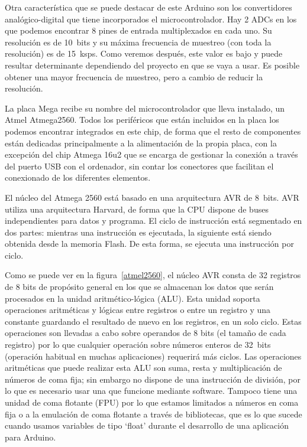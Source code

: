 Otra característica que se puede destacar de este Arduino son los convertidores analógico-digital que tiene incorporados el microcontrolador. Hay 2 ADCs en los que podemos encontrar 8 pines de entrada multiplexados en cada uno. Su resolución es de 10~bits y su máxima frecuencia de muestreo (con toda la resolución) es de 15~ksps. Como veremos después, este valor es bajo y puede resultar determinante dependiendo del proyecto en que se vaya a usar. Es posible obtener una mayor frecuencia de muestreo, pero a cambio de reducir la resolución.

La placa Mega recibe su nombre del microcontrolador que lleva instalado, un Atmel Atmega2560. Todos los periféricos que están incluidos en la placa los podemos encontrar integrados en este chip, de forma que el resto de componentes están dedicadas principalmente a la alimentación de la propia placa, con la excepción del chip Atmega 16u2 que se encarga de gestionar la conexión a través del puerto USB con el ordenador, sin contar los conectores que facilitan el conexionado de los diferentes elementos.

El núcleo del Atmega 2560 está basado en una arquitectura AVR de 8~bits. AVR utiliza una arquitectura Harvard, de forma que la CPU dispone de buses independientes para datos y programa. El ciclo de instrucción está segmentado en dos partes: mientras una instrucción es ejecutada, la siguiente está siendo obtenida desde la memoria Flash. De esta forma, se ejecuta una instrucción por ciclo.


Como se puede ver en la figura~\ref{atmel2560}, el núcleo AVR consta de 32 registros de 8 bits de propósito general en los que se almacenan los datos que serán procesados en la unidad aritmético-lógica (ALU). Esta unidad soporta operaciones aritméticas y lógicas entre registros o entre un registro y una constante guardando el resultado de nuevo en los registros, en un solo ciclo. Estas operaciones son llevadas a cabo sobre operandos de 8 bits (el tamaño de cada registro) por lo que cualquier operación sobre números enteros de 32~bits (operación habitual en muchas aplicaciones) requerirá más ciclos. Las operaciones aritméticas que puede realizar esta ALU son suma, resta y multiplicación de números de coma fija; sin embargo no dispone de una instrucción de división, por lo que es necesario usar una que funcione mediante software. Tampoco tiene una unidad de coma flotante (FPU) por lo que estamos limitados a números en coma fija o a la emulación de coma flotante a través de bibliotecas, que es lo que sucede cuando usamos variables de tipo `float' durante el desarrollo de una aplicación para Arduino.

